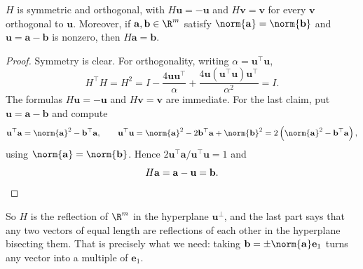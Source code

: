\begin{proposition}
  $H$ is symmetric and orthogonal, with $H\mathbf{u} = -\mathbf{u}$ and $H\mathbf{v} = \mathbf{v}$ for every $\mathbf{v}$ orthogonal to $\mathbf{u}$. Moreover, if $\mathbf{a},\mathbf{b}\in\R^m$ satisfy $\norm{\mathbf a} = \norm{\mathbf b}$ and $\mathbf{u} = \mathbf{a}-\mathbf{b}$ is nonzero, then $H\mathbf{a} = \mathbf{b}$.
\end{proposition}
\begin{proof}
  Symmetry is clear. For orthogonality, writing $\alpha = \mathbf{u}^\top\mathbf{u}$,
  $$
  H^\top H = H^2 = I - \frac{4\mathbf{u}\mathbf{u}^\top}{\alpha} + \frac{4\mathbf{u}(\mathbf{u}^\top\mathbf{u})\mathbf{u}^\top}{\alpha^2} = I .
  $$
  The formulas $H\mathbf u = -\mathbf u$ and $H\mathbf v = \mathbf v$ are immediate. For the last claim, put $\mathbf{u} = \mathbf a - \mathbf b$ and compute
  $$
  \mathbf{u}^\top\mathbf{a} = \norm{\mathbf a}^2 - \mathbf b^\top\mathbf a, \qquad \mathbf{u}^\top\mathbf{u} = \norm{\mathbf a}^2 - 2\mathbf b^\top\mathbf a + \norm{\mathbf b}^2 = 2\left(\norm{\mathbf a}^2 - \mathbf b^\top\mathbf a\right),
  $$
  using $\norm{\mathbf a} = \norm{\mathbf b}$. Hence $2\mathbf{u}^\top\mathbf a/\mathbf u^\top\mathbf u = 1$ and
  $$
  H\mathbf a = \mathbf a - \mathbf u = \mathbf b. \qedhere
  $$
\end{proof}

So $H$ is the reflection of $\R^m$ in the hyperplane $\mathbf{u}^\perp$, and the last part says that any two vectors of equal length are reflections of each other in the hyperplane bisecting them. That is precisely what we need: taking $\mathbf b = \pm\norm{\mathbf a}\mathbf e_1$ turns any vector into a multiple of $\mathbf e_1$.

\begin{center}
\end{center}

